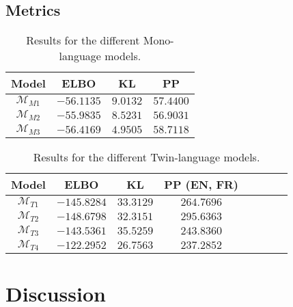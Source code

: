 \subsection{Metrics}

\begin{table}[!htbp]
  \centering
  \begin{tabular}{|c|c|c|c|} 
    \hline
    Model & ELBO  & KL & PP \\ [0.5ex] 
    \hline\hline
    $\mathcal{M}_{M1}$ & $-56.1135$ & $9.0132$ & $57.4400$ \\
    \hline
    $\mathcal{M}_{M2}$ & $-55.9835$ & $8.5231$ & $56.9031$ \\
    \hline
    $\mathcal{M}_{M3}$ & $-56.4169$ & $4.9505$ & $58.7118$ \\
    \hline
  \end{tabular}
  \caption{Results for the different Mono-language models.}
  \label{results:Mono_lang_results}
\end{table}

\begin{table}[!htbp]
  \centering
  \begin{tabular}{|c|c|c|c|c|c|c|c|} 
    \hline
    Model & ELBO & KL & PP (EN, FR)  \\ [0.5ex] 
    \hline\hline
    $\mathcal{M}_{T1}$ & $-145.8284$ & $33.3129$ & $264.7696$\\
    \hline
    $\mathcal{M}_{T2}$ & $-148.6798$ & $32.3151$ & $295.6363$\\
    \hline
    $\mathcal{M}_{T3}$ & $-143.5361$ & $35.5259$ & $243.8360$\\
    \hline
    $\mathcal{M}_{T4}$ & $-122.2952$ & $26.7563$ & $237.2852$\\
    \hline
  \end{tabular}
  \caption{Results for the different Twin-language models.}
  \label{results:Twin_lang_results}
\end{table}

\section{Discussion}

